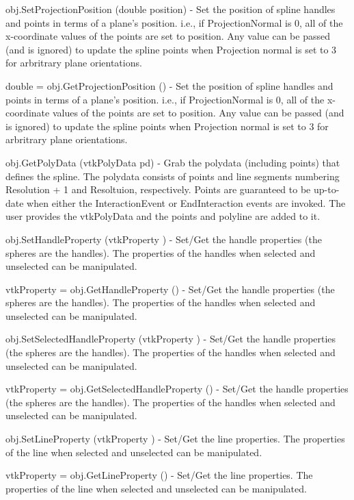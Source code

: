 \begin{DoxyItemize}
\item {\ttfamily obj.\-Set\-Projection\-Position (double position)} -\/ Set the position of spline handles and points in terms of a plane's position. i.\-e., if Projection\-Normal is 0, all of the x-\/coordinate values of the points are set to position. Any value can be passed (and is ignored) to update the spline points when Projection normal is set to 3 for arbritrary plane orientations.  
\item {\ttfamily double = obj.\-Get\-Projection\-Position ()} -\/ Set the position of spline handles and points in terms of a plane's position. i.\-e., if Projection\-Normal is 0, all of the x-\/coordinate values of the points are set to position. Any value can be passed (and is ignored) to update the spline points when Projection normal is set to 3 for arbritrary plane orientations.  
\item {\ttfamily obj.\-Get\-Poly\-Data (vtk\-Poly\-Data pd)} -\/ Grab the polydata (including points) that defines the spline. The polydata consists of points and line segments numbering Resolution + 1 and Resoltuion, respectively. Points are guaranteed to be up-\/to-\/date when either the Interaction\-Event or End\-Interaction events are invoked. The user provides the vtk\-Poly\-Data and the points and polyline are added to it.  
\item {\ttfamily obj.\-Set\-Handle\-Property (vtk\-Property )} -\/ Set/\-Get the handle properties (the spheres are the handles). The properties of the handles when selected and unselected can be manipulated.  
\item {\ttfamily vtk\-Property = obj.\-Get\-Handle\-Property ()} -\/ Set/\-Get the handle properties (the spheres are the handles). The properties of the handles when selected and unselected can be manipulated.  
\item {\ttfamily obj.\-Set\-Selected\-Handle\-Property (vtk\-Property )} -\/ Set/\-Get the handle properties (the spheres are the handles). The properties of the handles when selected and unselected can be manipulated.  
\item {\ttfamily vtk\-Property = obj.\-Get\-Selected\-Handle\-Property ()} -\/ Set/\-Get the handle properties (the spheres are the handles). The properties of the handles when selected and unselected can be manipulated.  
\item {\ttfamily obj.\-Set\-Line\-Property (vtk\-Property )} -\/ Set/\-Get the line properties. The properties of the line when selected and unselected can be manipulated.  
\item {\ttfamily vtk\-Property = obj.\-Get\-Line\-Property ()} -\/ Set/\-Get the line properties. The properties of the line when selected and unselected can be manipulated.  

\end{DoxyItemize}
